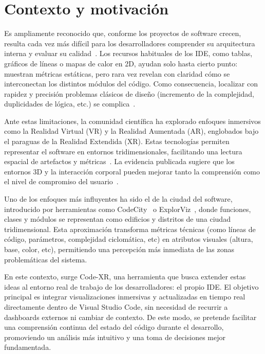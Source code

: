 \documentclass[a4paper, 12pt]{book}
\begin{document}
\section{Contexto y motivación}
\label{sec:contexto}

Es ampliamente reconocido que, conforme los proyectos de software crecen, resulta cada vez más difícil para los desarrolladores comprender su arquitectura interna y evaluar su calidad~\cite{koschke2003software}. Los recursos habituales de los IDE, como tablas, gráficos de líneas o mapas de calor en 2D, ayudan solo hasta cierto punto: muestran métricas estáticas, pero rara vez revelan con claridad cómo se interconectan los distintos módulos del código. Como consecuencia, localizar con rapidez y precisión problemas clásicos de diseño (incremento de la complejidad, duplicidades de lógica, etc.) se complica~\cite{ball1996software,meyer2008seven}.

Ante estas limitaciones, la comunidad científica ha explorado enfoques inmersivos como la Realidad Virtual (VR) y la Realidad Aumentada (AR), englobados bajo el paraguas de la Realidad Extendida (XR). Estas tecnologías permiten representar el software en entornos tridimensionales, facilitando una lectura espacial de artefactos y métricas~\cite{demiralp2006cave}. La evidencia publicada sugiere que los entornos 3D y la interacción corporal pueden mejorar tanto la comprensión como el nivel de compromiso del usuario~\cite{batch2019there}.

Uno de los enfoques más influyentes ha sido el de la ciudad del software, introducido por herramientas como CodeCity~\cite{wettel2007visualizing} o ExplorViz~\cite{fittkau2015exploring}, donde funciones, clases y módulos se representan como edificios y distritos de una ciudad tridimensional. Esta aproximación transforma métricas técnicas (como líneas de código, parámetros, complejidad ciclomática, etc) en atributos visuales (altura, base, color, etc), permitiendo una percepción más inmediata de las zonas problemáticas del sistema.

En este contexto, surge Code-XR, una herramienta que busca extender estas ideas al entorno real de trabajo de los desarrolladores: el propio IDE. El objetivo principal es integrar visualizaciones inmersivas y actualizadas en tiempo real directamente dentro de Visual Studio Code, sin necesidad de recurrir a dashboards externos ni cambiar de contexto. De este modo, se pretende facilitar una comprensión continua del estado del código durante el desarrollo, promoviendo un análisis más intuitivo y una toma de decisiones mejor fundamentada.
\end{document}
